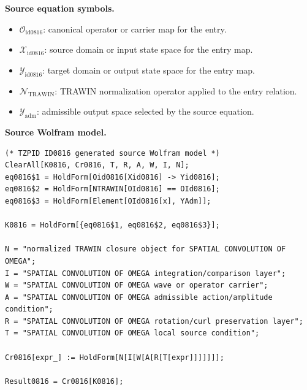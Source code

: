 \begin{minipage}[t]{0.49\linewidth}
\begingroup
\small
\raggedright
\textbf{Source equation symbols.}\par
\begin{itemize}[leftmargin=1.35em,itemsep=1pt,topsep=1pt,parsep=0pt]
    \item $\mathcal{O}_{\mathrm{id0816}}$: canonical operator or carrier map for the entry.
    \item $\mathcal{X}_{\mathrm{id0816}}$: source domain or input state space for the entry map.
    \item $\mathcal{Y}_{\mathrm{id0816}}$: target domain or output state space for the entry map.
    \item $\mathcal{N}_{\mathrm{TRAWIN}}$: TRAWIN normalization operator applied to the entry relation.
    \item $\mathcal{Y}_{\mathrm{adm}}$: admissible output space selected by the source equation.
\end{itemize}
\endgroup
\end{minipage}\hfill
\begin{minipage}[t]{0.47\linewidth}
\begingroup
\scriptsize
\raggedright
\textbf{Source Wolfram model.}\par
\begin{Verbatim}[fontsize=\tiny,breaklines=true,breakanywhere=true]
(* TZPID ID0816 generated source Wolfram model *)
ClearAll[K0816, Cr0816, T, R, A, W, I, N];
eq0816$1 = HoldForm[Oid0816[Xid0816] -> Yid0816];
eq0816$2 = HoldForm[NTRAWIN[OId0816] == OId0816];
eq0816$3 = HoldForm[Element[OId0816[x], YAdm]];

K0816 = HoldForm[{eq0816$1, eq0816$2, eq0816$3}];

N = "normalized TRAWIN closure object for SPATIAL CONVOLUTION OF OMEGA";
I = "SPATIAL CONVOLUTION OF OMEGA integration/comparison layer";
W = "SPATIAL CONVOLUTION OF OMEGA wave or operator carrier";
A = "SPATIAL CONVOLUTION OF OMEGA admissible action/amplitude condition";
R = "SPATIAL CONVOLUTION OF OMEGA rotation/curl preservation layer";
T = "SPATIAL CONVOLUTION OF OMEGA local source condition";

Cr0816[expr_] := HoldForm[N[I[W[A[R[T[expr]]]]]]];

Result0816 = Cr0816[K0816];
\end{Verbatim}
\endgroup
\end{minipage}

